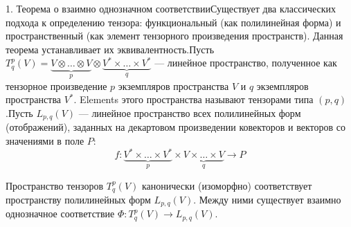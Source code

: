 \documentclass[14pt]{extreport}
\begin{document}
    \begin{defbox}
        1. Теорема о взаимно однозначном соответствииСуществует два классических подхода к определению тензора: функциональный (как полилинейная форма) и пространственный (как элемент тензорного произведения пространств). Данная теорема устанавливает их эквивалентность.Пусть $T_q^p(V) = \underbrace{V \otimes \dots \otimes V}_{p} \otimes \underbrace{V^* \times \dots \times V^*}_{q}$ — линейное пространство, полученное как тензорное произведение $p$ экземпляров пространства $V$ и $q$ экземпляров пространства $V^*$. Elements этого пространства называют тензорами типа $(p,q)$.Пусть $L_{p,q}(V)$ — линейное пространство всех полилинейных форм (отображений), заданных на декартовом произведении ковекторов и векторов со значениями в поле $P$:$$f: \underbrace{V^* \times \dots \times V^*}_{p} \times \underbrace{V \times \dots \times V}_{q} \to P$$
    \end{defbox}

    \begin{thbox}
        Пространство тензоров $T_q^p(V)$ канонически (изоморфно) соответствует пространству полилинейных форм $L_{p,q}(V)$. Между ними существует взаимно однозначное соответствие $\Phi: T_q^p(V) \to L_{p,q}(V)$.
    \end{thbox}
\end{document}
